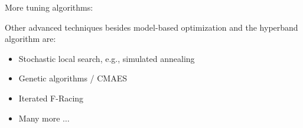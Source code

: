 \documentclass[11pt,compress,t,notes=noshow, xcolor=table]{beamer}
\begin{document}
\begin{frame}{More tuning algorithms:}

Other advanced techniques besides model-based optimization and the hyperband algorithm are: 
  
  \begin{itemize}
\item Stochastic local search, e.g., simulated annealing
\item Genetic algorithms / CMAES
\item Iterated F-Racing
\item Many more $\ldots$
  \end{itemize}


\end{frame}
\endlecture
\end{document}
